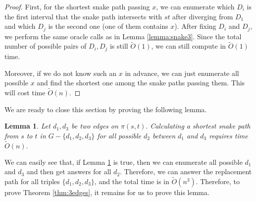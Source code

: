 \documentclass[11pt]{article}
\theoremstyle{plain}
\newtheorem{lemma}[theorem]{Lemma}
\theoremstyle{definition}
\newcommand{\too}[1]{\tilde{O}({#1})}
\begin{document}
\begin{proof}
    First, for the shortest snake path passing $x$, we can enumerate which $D_i$ is the first interval that the snake path intersects with $st$ after diverging from $D_1$ and which $D_j$ is the second one (one of them contains $x$). After fixing $D_i$ and $D_j$, we perform the same oracle calls as in Lemma \ref{lemma:snake3}. Since the total number of possible pairs of $D_i,D_j$ is still $\too{1}$, we can still compute in $\too{1}$ time.

    Moreover, if we do not know such an $x$ in advance, we can just enumerate all possible $x$ and find the shortest one among the snake paths passing them. This will cost time $\too{n}$.
    
\end{proof}
    







We are ready to close this section by proving the following lemma.
\begin{lemma}\label{thm1-5}
    Let $d_1,d_3$ be two edges on $\pi(s,t).$ Calculating a shortest snake path from $s$ to $t$ in $G-\{d_1,d_2,d_3\}$ for all possible $d_2$ between $d_1$ and $d_3$ requires time $\too{n}.$
\end{lemma}

We can easily see that, if Lemma \ref{thm1-5} is true, then we can enumerate all possible $d_1$ and $d_3$ and then get answers for all $d_2$. Therefore, we can answer the replacement path for all triples $\{d_1,d_2,d_3\}$, and the total time is in $\too{n^3}$. Therefore, to prove Theorem \ref{thm:3edges}, it remains for us to prove this lemma. 
 
\end{document}
